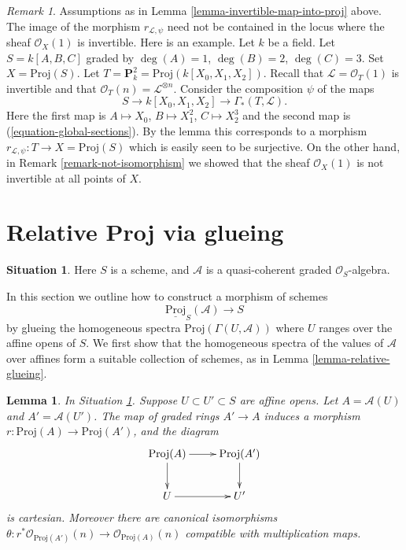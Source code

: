 \documentclass{stacks-project}
\theoremstyle{plain}
\newtheorem{lemma}[subsection]{Lemma}
\theoremstyle{definition}
\newtheorem{situation}[subsection]{Situation}
\theoremstyle{remark}
\newtheorem{remark}[subsection]{Remark}
\numberwithin{equation}{subsection}
\begin{document}
\begin{remark}
\label{remark-not-in-invertible-locus}
Assumptions as in Lemma \ref{lemma-invertible-map-into-proj} above.
The image of the morphism $r_{\mathcal{L}, \psi}$ need not be
contained in the locus where the sheaf $\mathcal{O}_X(1)$
is invertible.
Here is an example.
Let $k$ be a field.
Let $S = k[A, B, C]$ graded by $\deg(A) = 1$, $\deg(B) = 2$, $\deg(C) = 3$.
Set $X = \text{Proj}(S)$.
Let $T = \mathbf{P}^2_k = \text{Proj}(k[X_0, X_1, X_2])$.
Recall that $\mathcal{L} = \mathcal{O}_T(1)$ is invertible
and that $\mathcal{O}_T(n) = \mathcal{L}^{\otimes n}$.
Consider the composition $\psi$ of the maps
$$
S \to k[X_0, X_1, X_2] \to \Gamma_*(T, \mathcal{L}).
$$
Here the first map is $A \mapsto X_0$, $B \mapsto X_1^2$,
$C \mapsto X_2^3$ and the second map is (\ref{equation-global-sections}).
By the lemma this corresponds to a morphism
$r_{\mathcal{L}, \psi} : T \to X = \text{Proj}(S)$
which is easily seen to be surjective. On the other hand, in
Remark \ref{remark-not-isomorphism} we showed that the sheaf
$\mathcal{O}_X(1)$ is not invertible at all points of $X$.
\end{remark}










\section{Relative Proj via glueing}
\label{section-relative-proj-via-glueing}

\begin{situation}
\label{situation-relative-proj}
Here $S$ is a scheme, and $\mathcal{A}$
is a quasi-coherent graded $\mathcal{O}_S$-algebra.
\end{situation}

\noindent
In this section we outline how to construct a morphism
of schemes
$$
\underline{\text{Proj}}_S(\mathcal{A}) \longrightarrow S
$$
by glueing the homogeneous spectra $\text{Proj}(\Gamma(U, \mathcal{A}))$
where $U$ ranges over the affine opens of $S$. We first show that the
homogeneous spectra of the values of $\mathcal{A}$ over affines form a
suitable collection of schemes, as in Lemma \ref{lemma-relative-glueing}.

\begin{lemma}
\label{lemma-proj-inclusion}
In Situation \ref{situation-relative-proj}.
Suppose $U \subset U' \subset S$ are affine opens.
Let $A = \mathcal{A}(U)$ and $A' = \mathcal{A}(U')$.
The map of graded rings $A' \to A$ induces a morphism
$r : \text{Proj}(A) \to \text{Proj}(A')$, and the diagram
$$
\xymatrix{
\text{Proj}(A) \ar[r] \ar[d] &
\text{Proj}(A') \ar[d] \\
U \ar[r] &
U'
}
$$
is cartesian. Moreover there are canonical isomorphisms
$\theta : r^*\mathcal{O}_{\text{Proj}(A')}(n) \to
\mathcal{O}_{\text{Proj}(A)}(n)$ compatible with multiplication maps.
\end{lemma}
\end{document}
